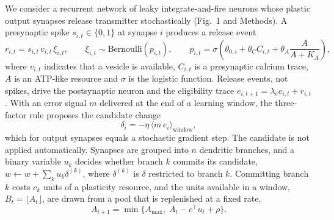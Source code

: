 We consider a recurrent network of leaky integrate-and-fire neurons whose plastic output synapses release transmitter stochastically (Fig.~1 and Methods). A presynaptic spike $s_{i,t}\in\{0,1\}$ at synapse $i$ produces a release event
\begin{equation}
r_{i,t}=s_{i,t}\,v_{i,t}\,\xi_{i,t},\qquad \xi_{i,t}\sim\mathrm{Bernoulli}(p_{i,t}),\qquad p_{i,t}=\sigma\!\left(\theta_{0,i}+\theta_{C}C_{i,t}+\theta_{A}\frac{A}{A+K_{A}}\right),
\label{eq:release}
\end{equation}
where $v_{i,t}$ indicates that a vesicle is available, $C_{i,t}$ is a presynaptic calcium trace, $A$ is an ATP-like resource and $\sigma$ is the logistic function. Release events, not spikes, drive the postsynaptic neuron and the eligibility trace $e_{i,t+1}=\lambda_{e}e_{i,t}+r_{i,t}$. With an error signal $m$ delivered at the end of a learning window, the three-factor rule proposes the candidate change
\begin{equation}
\delta_{i}=-\eta\,\big\langle m\,e_{i}\big\rangle_{\mathrm{window}},
\label{eq:threefactor}
\end{equation}
which for output synapses equals a stochastic gradient step\cite{bellec2020}. The candidate is not applied automatically. Synapses are grouped into $n$ dendritic branches\cite{poirazi2020}, and a binary variable $u_{k}$ decides whether branch $k$ commits its candidate, $w\leftarrow w+\sum_{k}u_{k}\delta^{(k)}$, where $\delta^{(k)}$ is $\delta$ restricted to branch $k$. Committing branch $k$ costs $c_{k}$ units of a plasticity resource, and the units available in a window, $B_{t}=\lfloor A_{t}\rfloor$, are drawn from a pool that is replenished at a fixed rate,
\begin{equation}
A_{t+1}=\min\!\big\{A_{\max},\;A_{t}-c^{\top}u_{t}+\rho\big\}.
\label{eq:atp}
\end{equation}

